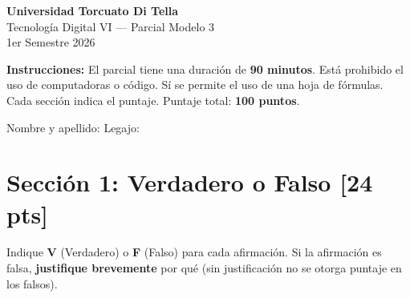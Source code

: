 \documentclass[11pt,a4paper]{article}
\newcommand{\puntaje}[1]{\textbf{[#1 pts]}}
\begin{document}
\begin{center}
  {\Large\bfseries Universidad Torcuato Di Tella}\\[4pt]
  {\large Tecnolog\'ia Digital VI --- Parcial Modelo 3}\\[2pt]
  {\normalsize 1er Semestre 2026}\\[8pt]
\end{center}

\begin{infobox}
\textbf{Instrucciones:} El parcial tiene una duraci\'on de \textbf{90 minutos}. Est\'a prohibido el uso de computadoras o c\'odigo. S\'i se permite el uso de una hoja de f\'ormulas. Cada secci\'on indica el puntaje. Puntaje total: \textbf{100 puntos}.
\end{infobox}

\vspace{0.5cm}

Nombre y apellido: \underline{\hspace{8cm}} \hfill Legajo: \underline{\hspace{3cm}}

\vspace{0.8cm}

\section*{Secci\'on 1: Verdadero o Falso \puntaje{24}}

\noindent Indique \textbf{V} (Verdadero) o \textbf{F} (Falso) para cada afirmaci\'on. Si la afirmaci\'on es falsa, \textbf{justifique brevemente} por qu\'e (sin justificaci\'on no se otorga puntaje en los falsos).

\vspace{0.3cm}
\end{document}
